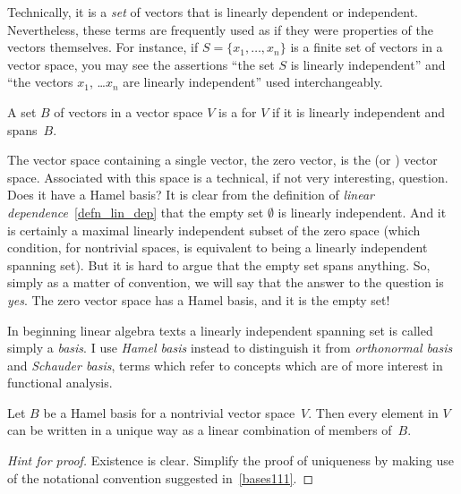 Technically, it is a \emph{set} of vectors that is linearly dependent or independent.
Nevertheless, these terms are frequently used as if they were properties of the vectors
themselves.  For instance, if $S = \{x_1, \dots, x_n\}$ is a finite set of vectors in a
vector space, you may see the assertions ``the set $S$ is linearly independent'' and
``the vectors $x_1$, \dots $x_n$ are linearly independent'' used interchangeably.

\begin{defn}\label{defn_Hamel_basis} A set $B$ of vectors in a vector space $V$ is a
 for $V$ if it is linearly independent and spans~$B$.
\end{defn}

\begin{conv}\label{conv_1_1} The vector space containing a single vector, the zero vector, is the
 (or
) vector space. Associated with this space is a technical, if not very interesting, question.  Does it have a Hamel basis?
It is clear from the definition of \emph{linear dependence}~\ref{defn_lin_dep} that the empty set $\emptyset$ is linearly
independent.  And it is certainly a maximal linearly independent subset of the zero space (which condition, for nontrivial
spaces, is equivalent to being a linearly independent spanning set).  But it is hard to argue that the empty set spans anything.
So, simply as a matter of convention, we will say that the answer to the question is \emph{yes}.  The zero vector space has a Hamel
basis, and it is the empty set!
\end{conv}

In beginning linear algebra texts a linearly independent spanning set is called simply a \emph{basis}.  I use \emph{Hamel basis}
instead to distinguish it from \emph{orthonormal basis} and \emph{Schauder basis}, terms which refer to concepts which are of
more interest in functional analysis.

\begin{prop} Let $B$ be a Hamel basis for a nontrivial vector space~$V$.  Then every element in $V$ can be written in a unique way as a linear
combination of members of~$B$.
\end{prop}

\begin{proof}[\emph{Hint for proof}] Existence is clear.  Simplify the proof of uniqueness by making use of the notational
convention suggested in~\ref{bases111}.   \ns
\end{proof}

